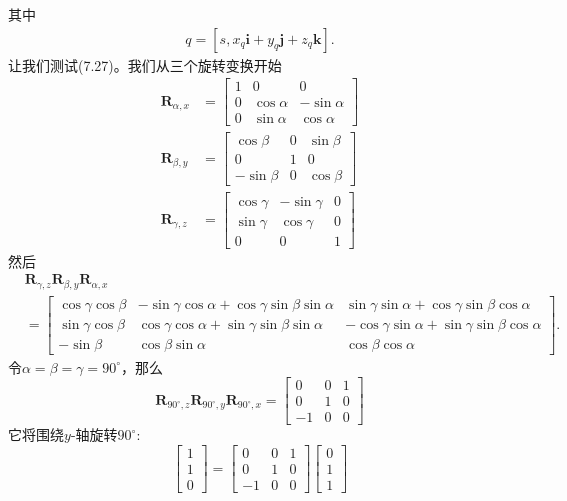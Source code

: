 其中
\begin{align}
    q=\left[s, x_{q} \mathbf{i}+y_{q} \mathbf{j}+z_{q} \mathbf{k}\right] .
\end{align}
让我们测试(7.27)。我们从三个旋转变换开始
$$
\begin{aligned}
\mathbf{R}_{\alpha, x} & =\left[\begin{array}{ccc}
1 & 0 & 0 \\
0 & \cos \alpha & -\sin \alpha \\
0 & \sin \alpha & \cos \alpha
\end{array}\right] \\
\mathbf{R}_{\beta, y} & =\left[\begin{array}{ccc}
\cos \beta & 0 & \sin \beta \\
0 & 1 & 0 \\
-\sin \beta & 0 & \cos \beta
\end{array}\right]\\
\mathbf{R}_{\gamma, z}& =\left[\begin{array}{ccc}
    \cos \gamma & -\sin \gamma & 0 \\
    \sin \gamma & \cos \gamma & 0 \\
    0 & 0 & 1
    \end{array}\right]
\end{aligned}
$$
然后
$$
\begin{aligned}
& \mathbf{R}_{\gamma, z} \mathbf{R}_{\beta, y} \mathbf{R}_{\alpha, x} \\
&= {\left[\begin{array}{ccc}
\cos \gamma \cos \beta & -\sin \gamma \cos \alpha+\cos \gamma \sin \beta \sin \alpha & \sin \gamma \sin \alpha+\cos \gamma \sin \beta \cos \alpha \\
\sin \gamma \cos \beta & \cos \gamma \cos \alpha+\sin \gamma \sin \beta \sin \alpha & -\cos \gamma \sin \alpha+\sin \gamma \sin \beta \cos \alpha \\
-\sin \beta & \cos \beta \sin \alpha & \cos \beta \cos \alpha
\end{array}\right] . }
\end{aligned}
$$
令$\alpha=\beta=\gamma=90^{\circ}$，那么
$$
\mathbf{R}_{90^{\circ}, z} \mathbf{R}_{90^{\circ}, y} \mathbf{R}_{90^{\circ}, x}=\left[\begin{array}{ccc}
0 & 0 & 1 \\
0 & 1 & 0 \\
-1 & 0 & 0
\end{array}\right]
$$
它将围绕$y$-轴旋转$90^{\circ}$:
$$
\left[\begin{array}{l}
1 \\
1 \\
0
\end{array}\right]=\left[\begin{array}{ccc}
0 & 0 & 1 \\
0 & 1 & 0 \\
-1 & 0 & 0
\end{array}\right]\left[\begin{array}{l}
0 \\
1 \\
1
\end{array}\right]
$$
